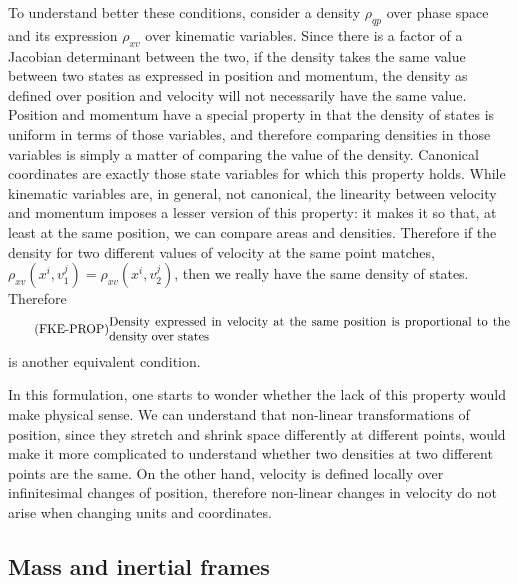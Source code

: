 To understand better these conditions, consider a density $\rho_{qp}$ over phase space and its expression $\rho_{xv}$ over kinematic variables. Since there is a factor of a Jacobian determinant between the two, if the density takes the same value between two states as expressed in position and momentum, the density as defined over position and velocity will not necessarily have the same value. Position and momentum have a special property in that the density of states is uniform in terms of those variables, and therefore comparing densities in those variables is simply a matter of comparing the value of the density. Canonical coordinates are exactly those state variables for which this property holds. While kinematic variables are, in general, not canonical, the linearity between velocity and momentum imposes a lesser version of this property: it makes it so that, at least at the same position, we can compare areas and densities. Therefore if the density for two different values of velocity at the same point matches, $\rho_{xv}(x^i, v_1^j) = \rho_{xv}(x^i, v_2^j)$, then we really have the same density of states. Therefore
\begin{equation}
	\tag{FKE-PROP}\label{rp-cm-fke-condDensityVelocity}
	\eqtext{Density expressed in velocity at the same position is proportional to the density over states}
\end{equation}
is another equivalent condition.

In this formulation, one starts to wonder whether the lack of this property would make physical sense. We can understand that non-linear transformations of position, since they stretch and shrink space differently at different points, would make it more complicated to understand whether two densities at two different points are the same. On the other hand, velocity is defined locally over infinitesimal changes of position, therefore non-linear changes in velocity do not arise when changing units and coordinates.

\subsection{Mass and inertial frames}

